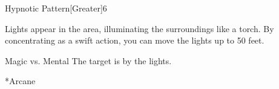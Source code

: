 \begin{spellsection}{Hypnotic Pattern}[Greater]{6}
    \begin{spellheader}
    \end{spellheader}
    \begin{spellcontent}
        \begin{spelltargetinginfo}
        \end{spelltargetinginfo}
        \begin{spelleffects}
            \spelleffect Lights appear in the area, illuminating the surroundings like a torch. By concentrating as a swift action, you can move the lights up to 50 feet.
            \spelldur \durmed
        \end{spelleffects}
    \end{spellcontent}
    \begin{spellsubcontent}
        \begin{spelltargetinginfo}
        \end{spelltargetinginfo}
        \begin{spelleffects}
            \begin{spellattack}{Magic vs. Mental}
                \spellsuccess The target is \fascinated by the lights.
            \end{spellattack}
        \end{spelleffects}
    \end{spellsubcontent}
    \begin{spellfooter}
        *{Arcane}
        \miscastyou
    \end{spellfooter}
\end{spellsection}


